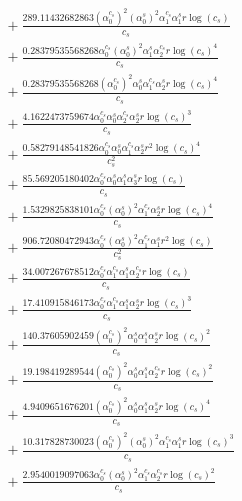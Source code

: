 \documentclass[10pt]{article}
\begin{document}
\begin{align*}
&{}  + \frac{289.11432682863 \left(\alpha_{0}^{c_s}\right)^{2} \left(\alpha_{0}^s\right)^{2} \alpha_{1}^{c_s} \alpha_{1}^s r \log{\left(c_{s} \right)}}{c_{s}} \\
&{}  + \frac{0.28379535568268 \alpha_{0}^{c_s} \left(\alpha_{0}^s\right)^{2} \alpha_{1}^s \alpha_{2}^{c_s} r \log{\left(c_{s} \right)}^{4}}{c_{s}} \\
&{}  + \frac{0.28379535568268 \left(\alpha_{0}^{c_s}\right)^{2} \alpha_{0}^s \alpha_{1}^{c_s} \alpha_{2}^s r \log{\left(c_{s} \right)}^{4}}{c_{s}} \\
&{}  + \frac{4.1622473759674 \alpha_{0}^{c_s} \alpha_{0}^s \alpha_{2}^{c_s} \alpha_{2}^s r \log{\left(c_{s} \right)}^{3}}{c_{s}} \\
&{}  + \frac{0.58279148541826 \alpha_{0}^{c_s} \alpha_{0}^s \alpha_{1}^{c_s} \alpha_{2}^s r^{2} \log{\left(c_{s} \right)}^{4}}{c_{s}^{2}} \\
&{}  + \frac{85.569205180402 \alpha_{0}^{c_s} \alpha_{0}^s \alpha_{1}^s \alpha_{3}^s r \log{\left(c_{s} \right)}}{c_{s}} \\
&{}  + \frac{1.5329825838101 \alpha_{0}^{c_s} \left(\alpha_{0}^s\right)^{2} \alpha_{1}^{c_s} \alpha_{2}^s r \log{\left(c_{s} \right)}^{4}}{c_{s}} \\
&{}  + \frac{906.72080472943 \alpha_{0}^{c_s} \left(\alpha_{0}^s\right)^{2} \alpha_{1}^{c_s} \alpha_{1}^s r^{2} \log{\left(c_{s} \right)}}{c_{s}^{2}} \\
&{}  + \frac{34.007267678512 \alpha_{0}^{c_s} \alpha_{1}^{c_s} \alpha_{1}^s \alpha_{2}^{c_s} r \log{\left(c_{s} \right)}}{c_{s}} \\
&{}  + \frac{17.410915846173 \alpha_{0}^{c_s} \alpha_{1}^{c_s} \alpha_{1}^s \alpha_{2}^s r \log{\left(c_{s} \right)}^{3}}{c_{s}} \\
&{}  + \frac{140.37605902459 \left(\alpha_{0}^{c_s}\right)^{2} \alpha_{0}^s \alpha_{1}^s \alpha_{2}^s r \log{\left(c_{s} \right)}^{2}}{c_{s}} \\
&{}  + \frac{19.198419289544 \left(\alpha_{0}^{c_s}\right)^{2} \alpha_{0}^s \alpha_{1}^s \alpha_{2}^{c_s} r \log{\left(c_{s} \right)}^{2}}{c_{s}} \\
&{}  + \frac{4.9409651676201 \left(\alpha_{0}^{c_s}\right)^{2} \alpha_{0}^s \alpha_{1}^s \alpha_{2}^s r \log{\left(c_{s} \right)}^{4}}{c_{s}} \\
&{}  + \frac{10.317828730023 \left(\alpha_{0}^{c_s}\right)^{2} \left(\alpha_{0}^s\right)^{2} \alpha_{1}^{c_s} \alpha_{1}^s r \log{\left(c_{s} \right)}^{3}}{c_{s}} \\
&{}  + \frac{2.9540019097063 \alpha_{0}^{c_s} \left(\alpha_{0}^s\right)^{2} \alpha_{1}^{c_s} \alpha_{2}^{c_s} r \log{\left(c_{s} \right)}^{2}}{c_{s}} \\

\end{align*}
\end{document}
